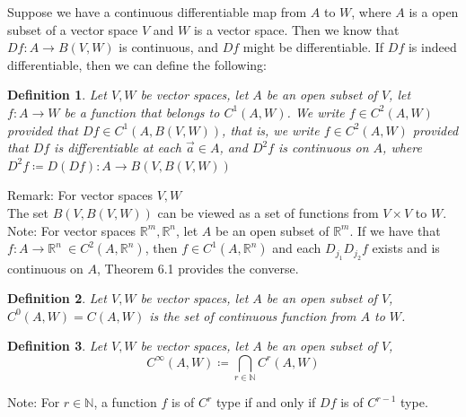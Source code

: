 \documentclass[15pt]{book}
\theoremstyle{break}
\theoremstyle{break}
\newtheorem{defn}{Definition}[corL]
\newcommand{\R}{\mathbb{R}}
\newcommand{\N}{\mathbb{N}}
\newcommand{\note}{\color{red}Note: \color{black}}
\newcommand{\remark}{\color{blue}Remark: \color{black}}
\begin{document}
Suppose we have a continuous differentiable map from $A$ to $W$, where $A$ is a open subset of a vector space $V$ and $W$ is a vector space. Then we know that $Df:A \to B(V,W)$ is continuous, and $Df$ might be differentiable. If $Df$ is indeed differentiable, then we can define the following:
\begin{defn}
Let $V,W$ be vector spaces, let $A$ be an open subset of $V$, let $f:A \to W$ be a function that belongs to $C^1(A,W)$. We write $f \in C^2(A,W)$ provided that $Df\in C^1(A,B(V,W))$, that is, we write $f \in C^2(A,W)$ provided that $Df$ is differentiable at each $\vec{a}\in A$, and $D^2f$ is continuous on $A$, where $D^2f\coloneqq D(Df): A \to B(V,B(V,W))$
\end{defn}

\remark For vector spaces $V,W$\\ The set $B(V,B(V,W))$ can be viewed as a set of functions from $V \times V$ to $W$.\\

\note For vector spaces $\R^m,\R^n$, let $A$ be an open subset of $\R^m$. If we have that $f:A \to \R^n\ \in C^2(A,\R^n)$, then $f\in C^1(A,\R^n)$ and each $D_{j_1}D_{j_2}f$ exists and is continuous on $A$, Theorem 6.1 provides the converse.

\begin{defn}
Let $V,W$ be vector spaces, let $A$ be an open subset of $V$,\\
$C^0(A,W) = C(A,W)$ is the set of continuous function from $A$ to $W$.
\end{defn}

\begin{defn}
Let $V,W$ be vector spaces, let $A$ be an open subset of $V$,\\
$$C^\infty(A,W) \coloneqq \bigcap_{r \in \N} C^r(A,W)$$
\end{defn}

\note For $r \in \N$, a function $f$ is of $C^r$ type if and only if $Df$  is of $C^{r-1}$ type.
\end{document}

